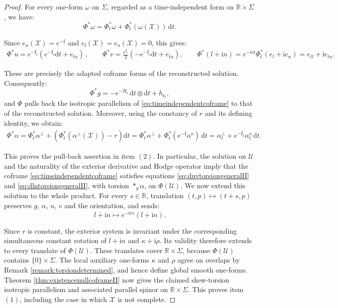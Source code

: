 \documentclass[10pt,reqno,a4paper]{amsart}
\theoremstyle{plain}
\theoremstyle{definition}
\theoremstyle{remark}
\theoremstyle{remark}
\def\dd{\mathrm{d}}
\def\cX{\mathcal{X}}
\def\cU{\mathcal{U}}
\def\fre{\mathfrak{e}}
\renewcommand{\(}{ (}
\renewcommand{\)}{ )}
\newcommand{\frf}{\mathfrak{f}}
\begin{document}
\begin{proof}
\noindent
For every one-form $\omega$ on $\Sigma$, regarded as a time-independent form on $\mathbb R\times\Sigma$, we have:
\begin{equation*}
\Phi^{\ast}\omega
=
\Phi_t^{\ast}\omega
+
\Phi_t^{\ast} (\omega(\cX) )\,\dd t.
\end{equation*}

\noindent
Since $e_u(\cX)=e^{-\frf}$ and $e_l(\cX)=e_n(\cX)=0$, this gives:
\begin{eqnarray*}
\Phi^{\ast}u = e^{-\frf_t} (e^{-\frf_t}\dd t+e_{tu})\, , \qquad \Phi^{\ast}v = \frac{e^{\frf_t}}{2} (-e^{-\frf_t}\dd t+e_{tu}), \qquad \Phi^{\ast}(l+\mathrm{i}n) =  e^{-\mathrm{i}rt}\Phi_t^{\ast}(e_l+\mathrm{i}e_n) = e_{tl}+\mathrm{i}e_{tn}.
\end{eqnarray*}

\noindent
These are precisely the adapted coframe forms of the reconstructed solution. Consequently:
\begin{equation*}
\Phi^{\ast}g
=
-e^{-2\frf_t}\,\dd t\otimes\dd t+h_{\fre_t},
\end{equation*}
and $\Phi$ pulls back the isotropic parallelism of \eqref{eq:timeindependentcoframe} to that of the reconstructed solution. Moreover, using the constancy of $r$ and its defining identity, we obtain:
\begin{eqnarray*}
\Phi^{\ast}\alpha =
\Phi_t^{\ast}\alpha^{\perp} + (\Phi_t^{\ast} (\alpha^{\perp}(\cX))-r )\dd t = 
\Phi_t^{\ast}\alpha^{\perp} + \Phi_t^{\ast}(e^{-\frf}\alpha^o)\,\dd t =  \alpha_t^{\perp} + e^{-\frf_t}\alpha_t^o\,\dd t.
\end{eqnarray*}

\noindent
This proves the pull-back assertion in item $(2)$. In particular, the solution on $\cU$ and the naturality of the exterior derivative and Hodge operator imply that the coframe \eqref{eq:timeindependentcoframe} satisfies equations \eqref{eq:duvtorsiongeneralII} and \eqref{eq:dlntorsiongeneralII}, with torsion $\ast_g\alpha$, on $\Phi(\cU)$. We now extend this solution to the whole product. For every $s\in\mathbb R$, translation $(t,p)\mapsto(t+s,p)$ preserves $g$, $\alpha$, $u$, $v$ and the orientation, and sends:
\begin{equation*}
l+\mathrm{i}n
\longmapsto
e^{-\mathrm{i}rs}(l+\mathrm{i}n).
\end{equation*}

\noindent
Since $r$ is constant, the exterior system is invariant under the corresponding simultaneous constant rotation of $l+\mathrm{i}n$ and $\kappa+\mathrm{i}\rho$. Its validity therefore extends to every translate of $\Phi(\cU)$. These translates cover $\mathbb R\times\Sigma$, because $\Phi(\cU)$ contains $\{0\}\times\Sigma$. The local auxiliary one-forms $\kappa$ and $\rho$ agree on overlaps by Remark \ref{remark:torsiondetermined}, and hence define global smooth one-forms. Theorem \ref{thm:existencenullcoframeII} now gives the claimed skew-torsion isotropic parallelism and associated parallel spinor on $\mathbb R\times\Sigma$. This proves item $(1)$, including the case in which $\cX$ is not complete.


\end{proof}
\end{document}
